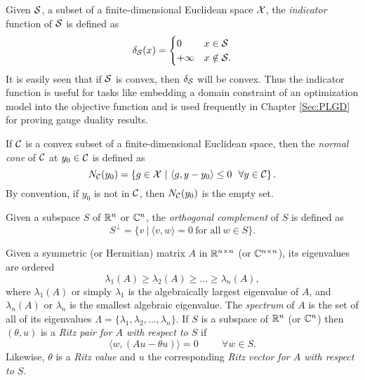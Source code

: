 Given ${\mathcal S}$, a subset of a finite-dimensional Euclidean space ${\mathcal X}$, the \textit{indicator} function of ${\mathcal S}$ is defined as
\begin{equation}  			\label{Def:indicator_function}
\delta_{\mathcal S}(x) =
	\begin{cases}
		0		&	x \in {\mathcal S}		\\
		+\infty		&	x \notin {\mathcal S}.
	\end{cases}
\end{equation}
It is easily seen that if ${\mathcal S}$ is convex, then $\delta_{\mathcal S}$ will be convex.  Thus the indicator function is useful for tasks like embedding a domain constraint of an optimization model into the objective function and is used frequently in Chapter \ref{Sec:PLGD} for proving gauge duality results.

If ${\mathcal C}$ is a convex subset of a finite-dimensional Euclidean space, then the \textit{normal cone} of ${\mathcal C}$ at $y_0 \in {\mathcal C}$ is defined as
\begin{equation} 			\label{Def:normal_cone}
N_{\mathcal C}(y_0) = \left\{ g \in {\mathcal X} \ | \ \langle g, y - y_0 \rangle \leq 0 \ \ \forall y \in {\mathcal C} \right\}.
\end{equation}
By convention, if $y_0$ is not in ${\mathcal C}$, then $N_{\mathcal C}(y_0)$ is the empty set.

Given a subspace $S$ of ${\mathbb R}^n$ or ${\mathbb C}^n$, the \textit{orthogonal complement} of $S$ is defined as
\begin{equation}
S^\perp = \{ v \ | \ \langle v, w \rangle = 0 \ \text{for all} \ w \in S \}.
\end{equation}


Given a symmetric (or Hermitian) matrix $A$ in ${\mathbb R}^{n \times n}$ (or ${\mathbb C}^{n \times n}$), its eigenvalues are ordered
\begin{equation}			\label{Def:eigenvalues}
\lambda_1(A) \geq \lambda_2(A) \geq \ldots \geq \lambda_n(A),
\end{equation}
where $\lambda_1(A)$ or simply $\lambda_1$ is the algebraically largest eigenvalue of $A$, and $\lambda_n(A)$ or $\lambda_n$ is the smallest algebraic eigenvalue.  The \textit{spectrum} of $A$ is the set of all of its eigenvalues $\Lambda = \{ \lambda_1, \lambda_2, \ldots, \lambda_n\}$.
If $S$ is a subspace of ${\mathbb R}^n$ (or ${\mathbb C}^n$) then $(\theta, u)$ is a \textit{Ritz pair for $A$ with respect to $S$} if 
\begin{equation} 			\label{Def:Ritz_pair_val_vec}
\langle w, (Au-\theta u) \rangle = 0 \hspace{1cm} \forall w \in S.
\end{equation}
Likewise, $\theta$ is a \textit{Ritz value} and $u$ the corresponding \textit{Ritz vector for $A$ with respect to $S$}.

